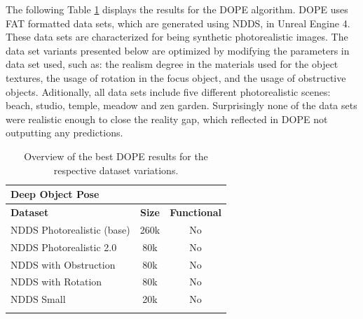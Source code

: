 The following Table \ref{tab:DOPE-results} displays the results for the DOPE algorithm. DOPE uses FAT formatted data sets, which are generated using NDDS, in Unreal Engine 4. These data sets are characterized for being synthetic photorealistic images. The data set variants presented below are optimized by modifying the parameters in data set used, such as:
the realism degree in the materials used for the object textures, the usage of rotation in the focus object, and the usage of obstructive objects. Aditionally, all data sets include five different photorealistic scenes: beach, studio, temple, meadow and zen garden. Surprisingly none of the data sets were realistic enough to close the reality gap, which reflected in DOPE not outputting any predictions.

\begin{longtable}{|l|c||c|}                            \hline
\multicolumn{3}{|l|}{\textbf{Deep Object Pose}}              \\\hline
\textbf{Dataset}            & \textbf{Size}  & \textbf{Functional}            \\ \hline
NDDS Photorealistic (base)       & 260k      & No                             \\ \hline
NDDS Photorealistic 2.0          & 80k       & No                             \\ \hline
NDDS with Obstruction       & 80k       & No                             \\ \hline
NDDS with Rotation          & 80k       & No                             \\ \hline
NDDS Small                  & 20k       & No                             \\ \hline
\caption{Overview of the best DOPE results for the respective dataset variations.} \label{tab:DOPE-results}
\end{longtable}

